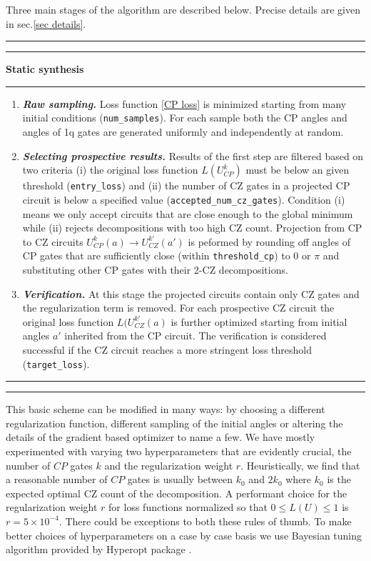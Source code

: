 \documentclass[amsfonts, amssymb, aps, nofootinbib, twocolumn]{revtex4-2}
\newcommand{\CZ}{CZ }
\newcommand{\CP}{CP }
\newcommand{\param}[1]{\texttt{#1}}
\begin{document}
Three main stages of the algorithm are described below. Precise details are given in sec.\ref{sec details}.
\\[6pt]
\hrule
\hrule
\vspace{6pt}
{\large\textbf{\qquad Static synthesis}}
\vspace{6pt}
\hrule
\begin{enumerate}
\item \textit{\textbf{ Raw sampling.}} Loss function \eqref{CP loss} is minimized starting from many initial conditions (\param{num\_samples}). For each sample both the \CP angles and angles of 1q gates are generated uniformly and independently at random. 
\item \textit{\textbf{Selecting prospective results.}} Results of the first step are filtered based on two criteria (i) the original loss function $L(U^k_{CP})$ must be below an  given threshold (\param{entry\_loss}) and (ii) the number of \CZ gates in a projected \CP circuit is below a specified value (\param{accepted\_num\_cz\_gates}). Condition (i) means we only accept circuits that are close enough to the global minimum while (ii) rejects decompositions with too high \CZ count. Projection from \CP to \CZ circuits $U_{CP}^k(a)\to U_{CZ}^{k'}(a')$ is peformed by rounding off angles of \CP gates that are sufficiently close (within \param{threshold\_cp}) to $0$ or $\pi$ and substituting other \CP gates with their 2-\CZ decompositions. 
\item \textit{\textbf{Verification.}} At this stage the projected circuits contain only \CZ gates and the regularization term is removed. For each prospective \CZ circuit the original loss function $L(U_{CZ}^{k'}(a)$ is further optimized starting from initial angles $a'$ inherited from the \CP circuit. The verification is considered successful if the \CZ circuit reaches a more stringent loss threshold (\param{target\_loss}). 
\end{enumerate}
\hrule
\hrule
\vspace{20pt}

This basic scheme can be modified in many ways: by choosing a different regularization function, different sampling of the initial angles or altering the details of the gradient based optimizer to name a few. We have mostly experimented with varying two hyperparameters that are evidently crucial, the number of $CP$ gates $k$ and the regularization weight $r$. Heuristically, we find that a reasonable number of $CP$ gates is usually between $k_0$ and $2k_0$ where $k_0$ is the expected optimal \CZ count of the decomposition. A performant choice for the regularization weight $r$ for loss functions normalized so that $0\le L(U) \le 1$ is $r=5\times 10^{-4}$. There could be exceptions to both these rules of thumb. To make better choices of hyperparameters on a case by case basis we use Bayesian tuning algorithm provided by Hyperopt package \cite{hyperopt}.
\end{document}
